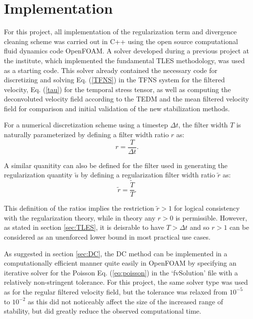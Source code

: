 \chapter{Implementation} \label{chap:Imp}


For this project, all implementation of the regularization term and divergence cleaning scheme was carried out in C++ using the open source computational fluid dynamics code OpenFOAM. A solver developed during a previous project at the institute, which implemented the fundamental TLES methodology, was used as a starting code. This solver already contained the necessary code for discretizing and solving Eq. (\ref{TFNS}) in the TFNS system for the filtered velocity, Eq. (\ref{tau}) for the temporal stress tensor, as well as computing the deconvoluted velocity field according to the TEDM and the mean filtered velocity field for comparison and initial validation of the new stabilization methods.

For a numerical discretization scheme using a timestep $\Delta t$, the filter width $T$ is naturally parameterized by defining a filter width ratio $r$ as:
\begin{equation} \label{r}
r=\frac{T}{\Delta t}.
\end{equation}

A similar quanitity can also be defined for the filter used in generating the regularization quantity $\tilde{u}$ by defining a regularization filter width ratio $\tilde{r}$ as:
\begin{equation}
\tilde{r}=\frac{\tilde{T}}{T}.
\end{equation}

This definition of the ratios implies the restriction $\tilde{r}>1$ for logical consistency with the regularization theory, while in theory any $r>0$ is permissible. However, as stated in section \ref{sec:TLES}, it is deisrable to have $T>\Delta t$ and so $r>1$ can be considered as an unenforced lower bound in most practical use cases.

As suggested in section \ref{sec:DC}, the DC method can be implemented in a computationally efficient manner quite easily in OpenFOAM by specifying an iterative solver for the Poisson Eq. (\ref{eq:poisson}) in the `fvSolution' file with a relatively non-stringent tolerance. For this project, the same solver type was used as for the regular filtered velocity field, but the tolerance was relaxed from $10^{-5}$ to $10^{-2}$ as this did not noticeably affect the size of the increased range of stability, but did greatly reduce the observed computational time.

